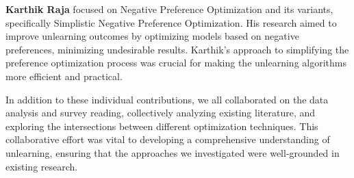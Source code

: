 \documentclass[11pt]{article}
\begin{document}
    \textbf{Karthik Raja} focused on Negative Preference Optimization and its variants, specifically Simplistic Negative Preference Optimization. His research aimed to improve unlearning outcomes by optimizing models based on negative preferences, minimizing undesirable results. Karthik's approach to simplifying the preference optimization process was crucial for making the unlearning algorithms more efficient and practical.

    In addition to these individual contributions, we all collaborated on the data analysis and survey reading, collectively analyzing existing literature, and exploring the intersections between different optimization techniques. This collaborative effort was vital to developing a comprehensive understanding of unlearning, ensuring that the approaches we investigated were well-grounded in existing research.


    
    
\end{document}
